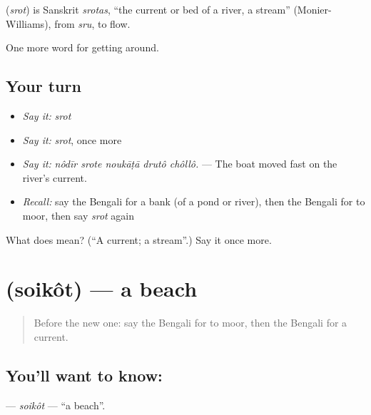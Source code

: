 \begin{cousinweb}
\textbf{} (\emph{srot}) is Sanskrit \emph{srotas}, \textquotedblleft{}the current or bed of a river, a stream\textquotedblright{} (Monier-Williams), from \emph{sru}, to flow.
\end{cousinweb}

\begin{grammarlens}[title={What you've built}]
One more word for getting around.
\end{grammarlens}

\subsection*{Your turn}
\begin{itemize}
\raggedright
  \item \emph{Say it:} \emph{srot}
  \item \emph{Say it:} \emph{srot}, once more
  \item \emph{Say it:} \emph{nôdīr srote noukāṭā drutô chôllô.} — The boat moved fast on the river's current.
  \item \emph{Recall:} say the Bengali for a bank (of a pond or river), then the Bengali for to moor, then say \emph{srot} again
\end{itemize}

\begin{tcolorbox}[breakable,colback=teal!4,colframe=teal!35!black,title={Before you move on}]
What does  mean? (\textquotedblleft{}A current; a stream\textquotedblright{}.) Say it once more.
\end{tcolorbox}
\section[\texorpdfstring{\bn{সৈকত} (soikôt)}{সৈকত (soikôt)}]{ (soikôt) — a beach}

\label{lesson:BN-C398-soikot}



\begin{quote}
Before the new one: say the Bengali for to moor, then the Bengali for a current.
\end{quote}

\subsection*{You'll want to know: }
\textbf{} — \emph{soikôt} — \textquotedblleft{}a beach\textquotedblright{}.

